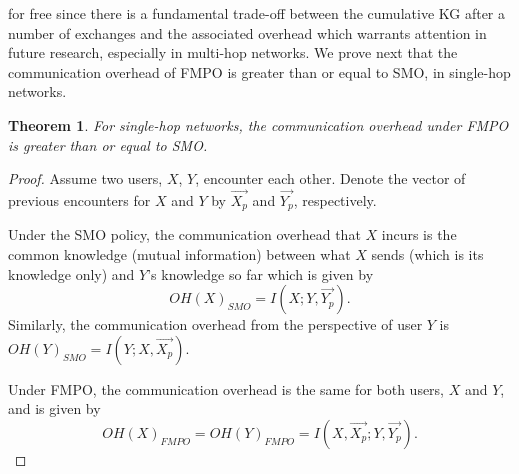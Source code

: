 \documentclass[conference]{IEEEtran}
\newtheorem{theorem}{Theorem}
\theoremstyle{definition}
\begin{document}
for free since there is a fundamental trade-off between the cumulative KG after a number of exchanges and the associated overhead which warrants attention in future research, especially in multi-hop networks. We prove next that the communication overhead of FMPO is greater than or equal to SMO, in single-hop networks.
%
\vspace{-0.2 cm}
\begin{theorem}
For single-hop networks, the communication overhead under FMPO is greater than or equal to SMO.
\end{theorem}
%
\vspace{-0.5 cm}
\begin{proof}
Assume two users, $X$, $Y$, encounter each other. Denote the vector of previous encounters for $X$ and $Y$ by $\vec{X_p}$ and $\vec{Y_p}$, respectively.

Under the SMO policy, the communication overhead that $X$ incurs is the common knowledge (mutual information) between what $X$ sends (which is its knowledge only) and $Y$'s 
knowledge so far which is given by 
\begin{equation}
OH(X)_{SMO}=I(X;Y,\vec{Y_p}).
\label{overheadX}
\end{equation}
Similarly, the communication overhead from the perspective of user $Y$ is $OH(Y)_{SMO}=I(Y;X,\vec{X_p})$.

Under FMPO, the communication overhead is the same for both users, $X$ and $Y$, and is given by
\begin{equation} 
OH(X)_{FMPO}=OH(Y)_{FMPO}=I(X,\vec{X_p};Y, \vec{Y_p}).
\label{overheadXY}
\end{equation}


\end{proof}
\end{document}

